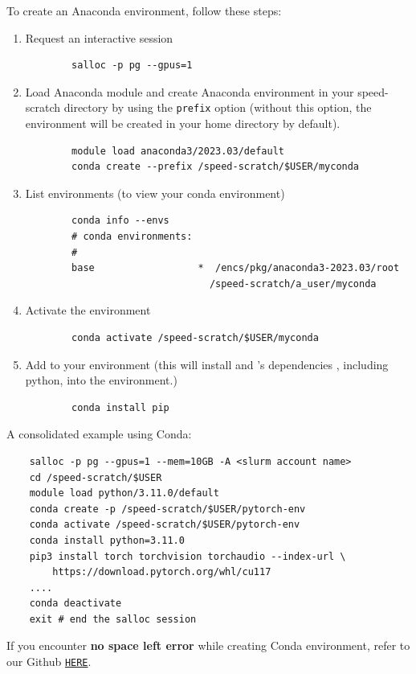 \documentclass{easychair}
\begin{document}
To create an Anaconda environment, follow these steps:
\begin{enumerate}
	\item Request an interactive session
	\begin{verbatim}
		salloc -p pg --gpus=1
	\end{verbatim}

	\item Load Anaconda module and create Anaconda environment in your speed-scratch directory by using 
	the \texttt{\-\-prefix} option (without this option, the environment will be created in your home directory by default).
	\begin{verbatim}
		module load anaconda3/2023.03/default
		conda create --prefix /speed-scratch/$USER/myconda
	\end{verbatim}

	\item List environments (to view your conda environment)
	\begin{verbatim}
		conda info --envs
		# conda environments:
		#
		base                  *  /encs/pkg/anaconda3-2023.03/root
                         		/speed-scratch/a_user/myconda
	\end{verbatim}

	\item Activate the environment
	\begin{verbatim}
		conda activate /speed-scratch/$USER/myconda
	\end{verbatim}

	\item Add  to your environment (this will install  and 's dependencies
	, including python, into the environment.)
	\begin{verbatim}
		conda install pip
	\end{verbatim}
\end{enumerate}   

\noindent A consolidated example using Conda:
\begin{verbatim}
	salloc -p pg --gpus=1 --mem=10GB -A <slurm account name>
	cd /speed-scratch/$USER
	module load python/3.11.0/default
	conda create -p /speed-scratch/$USER/pytorch-env
	conda activate /speed-scratch/$USER/pytorch-env
	conda install python=3.11.0
	pip3 install torch torchvision torchaudio --index-url \ 
		https://download.pytorch.org/whl/cu117
	....
	conda deactivate
	exit # end the salloc session
\end{verbatim}

\noindent If you encounter \textbf{no space left error} while creating Conda environment, refer to our Github 
\href{https://github.com/NAG-DevOps/speed-hpc/tree/master/src#no-space-left-error-when-creating-conda-environment}
{\texttt{HERE}}.\\
\end{document}
